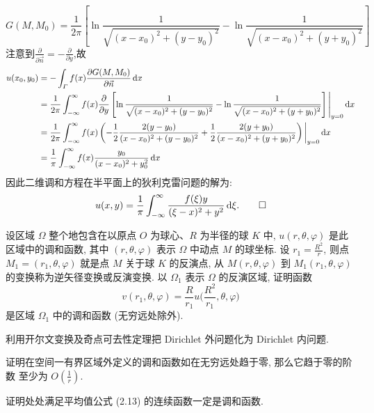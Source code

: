 \begin{solve}
  \[G(M,M_0)=\frac{1}{2\pi}\left[\ln\frac{1}{\sqrt{(x-x_0)^2+(y-y_0)^2}}-\ln\frac{1}{\sqrt{(x-x_0)^2+(y+y_0)^2}}\right]\]
  注意到$\frac{\partial}{\partial\vec{n}}=-\frac{\partial}{\partial y}$,故
  \[\begin{split}
  u(x_0,y_0)&=-\int_{\varGamma}f(x)\frac{\partial G(M,M_0)}{\partial\vec{n}}\mathop{}\!\mathrm{d} x\\
  &=\frac{1}{2\pi}\int_{-\infty}^{\infty}f(x)\frac{\partial}{\partial y}\left[\ln\frac{1}{\sqrt{(x-x_0)^2+(y-y_0)^2}}-\ln\frac{1}{\sqrt{(x-x_0)^2+(y+y_0)^2}}\right]\Bigg|_{y=0}\mathop{}\!\mathrm{d} x\\
  &=\frac{1}{2\pi}\int_{-\infty}^{\infty}f(x)\left(-\frac{1}{2}\frac{2(y-y_0)}{(x-x_0)^2+(y-y_0)^2}+\frac{1}{2}\frac{2(y+y_0)}{(x-x_0)^2+(y+y_0)^2}\right)\bigg|_{y=0}\mathop{}\!\mathrm{d} x\\
  &=\frac{1}{\pi}\int_{-\infty}^{\infty}f(x)\frac{y_0}{(x-x_0)^2+y_0^2}\mathop{}\!\mathrm{d} x
  \end{split}\]
  因此二维调和方程在半平面上的狄利克雷问题的解为:
  \[u(x,y)=\frac{1}{\pi}\int_{-\infty}^{\infty}\frac{f(\xi)y}{(\xi-x)^2+y^2}\mathop{}\!\mathrm{d}\xi. \qedhere\]
\end{solve}


\begin{exercise}
  设区域 $\varOmega$ 整个地包含在以原点 $O$ 为球心、$R$ 为半径的球 $K$ 中,
  $u(r,\theta,\varphi)$ 是此区域中的调和函数, 其中 $(r,\theta,\varphi)$
  表示 $\varOmega$ 中动点 $M$ 的球坐标. 设 $r_1=\frac{R^2}{r}$, 则点
  $M_1=(r_1,\theta,\varphi)$ 就是点 $M$ 关于球 $K$ 的反演点, 从 $M(r,\theta,\varphi)$
  到 $M_1(r_1,\theta,\varphi)$ 的变换称为逆矢径变换或反演变换. 以 $\varOmega_1$
  表示 $\varOmega$ 的反演区域, 证明函数
  \[ v(r_1,\theta,\varphi) = \frac{R}{r_1} u\biggl(\frac{R^2}{r_1},\theta,\varphi\biggr)\]
  是区域 $\varOmega_1$ 中的调和函数 (无穷远处除外).
\end{exercise}


\begin{exercise}
  利用开尔文变换及奇点可去性定理把 Dirichlet 外问题化为 Dirichlet 内问题.
\end{exercise}

\begin{exercise}
  证明在空间一有界区域外定义的调和函数如在无穷远处趋于零, 那么它趋于零的阶数
  至少为 $O(\frac{1}{r})$.
\end{exercise}

\begin{exercise}
  证明处处满足平均值公式 (2.13) 的连续函数一定是调和函数.
\end{exercise}


